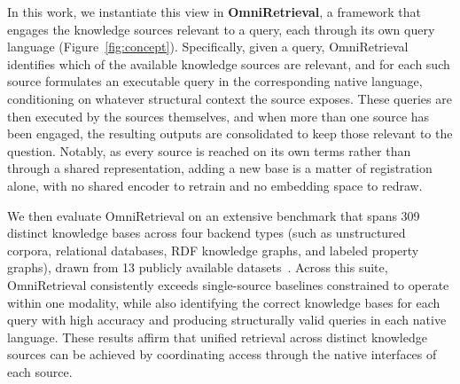 In this work, we instantiate this view in \textbf{OmniRetrieval}, a framework that engages the knowledge sources relevant to a query, each through its own query language (Figure~\ref{fig:concept}). Specifically, given a query, OmniRetrieval identifies which of the available knowledge sources are relevant, and for each such source formulates an executable query in the corresponding native language, conditioning on whatever structural context the source exposes. These queries are then executed by the sources themselves, and when more than one source has been engaged, the resulting outputs are consolidated to keep those relevant to the question. Notably, as every source is reached on its own terms rather than through a shared representation, adding a new base is a matter of registration alone, with no shared encoder to retrain and no embedding space to redraw.

We then evaluate OmniRetrieval on an extensive benchmark that spans 309 distinct knowledge bases across four backend types (such as unstructured corpora, relational databases, RDF knowledge graphs, and labeled property graphs), drawn from 13 publicly available datasets~\citep{SimpleQuestions, Spider, LCQuAD2, BEIR, Bird, QALD10, Text2Cypher}. Across this suite, OmniRetrieval consistently exceeds single-source baselines constrained to operate within one modality, while also identifying the correct knowledge bases for each query with high accuracy and producing structurally valid queries in each native language. These results affirm that unified retrieval across distinct knowledge sources can be achieved by coordinating access through the native interfaces of each source.
